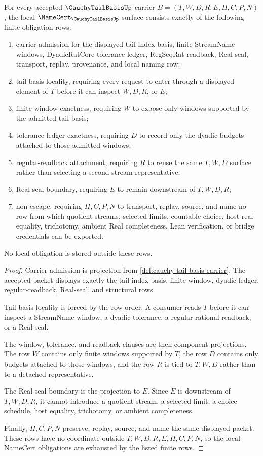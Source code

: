 \begin{theorem}
\label{thm:cauchy-tail-basis-namecert-obligations}
For every accepted $\CauchyTailBasisUp$ carrier $B=(T,W,D,R,E,H,C,P,N)$, the local $\NameCert_{\CauchyTailBasisUp}$ surface consists exactly of the following finite obligation rows:
\begin{enumerate}
\item carrier admission for the displayed tail-index basis, finite StreamName windows, DyadicRatCore tolerance ledger, RegSeqRat readback, Real seal, transport, replay, provenance, and local naming row;
\item tail-basis locality, requiring every request to enter through a displayed element of $T$ before it can inspect $W,D,R$, or $E$;
\item finite-window exactness, requiring $W$ to expose only windows supported by the admitted tail basis;
\item tolerance-ledger exactness, requiring $D$ to record only the dyadic budgets attached to those admitted windows;
\item regular-readback attachment, requiring $R$ to reuse the same $T,W,D$ surface rather than selecting a second stream representative;
\item Real-seal boundary, requiring $E$ to remain downstream of $T,W,D,R$;
\item non-escape, requiring $H,C,P,N$ to transport, replay, source, and name no row from which quotient streams, selected limits, countable choice, host real equality, trichotomy, ambient Real completeness, Lean verification, or bridge credentials can be exported.
\end{enumerate}
No local obligation is stored outside these rows.
\end{theorem}
\begin{proof}
Carrier admission is projection from \autoref{def:cauchy-tail-basis-carrier}. The accepted packet displays exactly the tail-index basis, finite-window, dyadic-ledger, regular-readback, Real-seal, and structural rows.

Tail-basis locality is forced by the row order. A consumer reads $T$ before it can inspect a StreamName window, a dyadic tolerance, a regular rational readback, or a Real seal.

The window, tolerance, and readback clauses are then component projections. The row $W$ contains only finite windows supported by $T$, the row $D$ contains only budgets attached to those windows, and the row $R$ is tied to $T,W,D$ rather than to a detached representative.

The Real-seal boundary is the projection to $E$. Since $E$ is downstream of $T,W,D,R$, it cannot introduce a quotient stream, a selected limit, a choice schedule, host equality, trichotomy, or ambient completeness.

Finally, $H,C,P,N$ preserve, replay, source, and name the same displayed packet. These rows have no coordinate outside $T,W,D,R,E,H,C,P,N$, so the local NameCert obligations are exhausted by the listed finite rows.
\end{proof}

